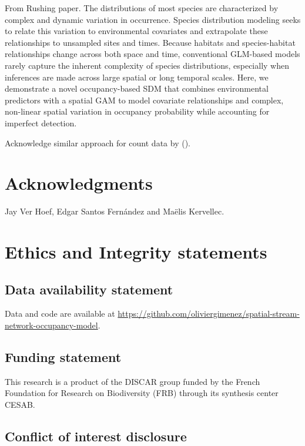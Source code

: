 \documentclass[
  11pt,
  a4paper,
]{article}
\begin{document}
From Rushing paper. The distributions of most species are characterized by complex and dynamic variation in occurrence. Species distribution modeling seeks to relate this variation to environmental covariates and extrapolate these relationships to unsampled sites and times. Because habitats and species-habitat relationships change across both space and time, conventional GLM-based models rarely capture the inherent complexity of species distributions, especially when inferences are made across large spatial or long temporal scales. Here, we demonstrate a novel occupancy-based SDM that combines environmental predictors with a spatial GAM to model covariate relationships and complex, non-linear spatial variation in occupancy probability while accounting for imperfect detection.

Acknowledge similar approach for count data by ().

\section{Acknowledgments}\label{acknowledgments}

Jay Ver Hoef, Edgar Santos Fernández and Maëlis Kervellec.

\section{Ethics and Integrity statements}\label{ethics-and-integrity-statements}

\subsection{Data availability statement}\label{data-availability-statement}

Data and code are available at \href{https://github.com/oliviergimenez/spatial-stream-network-occupancy-model}{https://github.com/oliviergimenez/spatial-stream-network-occupancy-model}.

\subsection{Funding statement}\label{funding-statement}

This research is a product of the DISCAR group funded by the French Foundation for Research on Biodiversity (FRB) through its synthesis center CESAB.

\subsection{Conflict of interest disclosure}\label{conflict-of-interest-disclosure}
\end{document}
